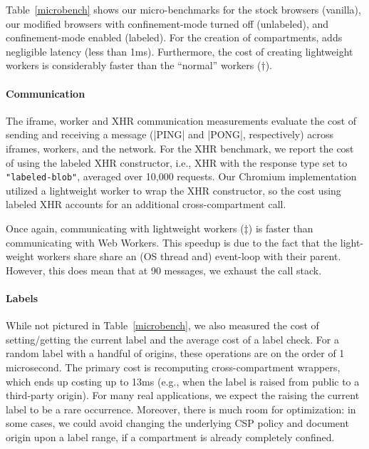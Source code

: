 Table~\ref{microbench} shows our micro-benchmarks for the stock
browsers (vanilla), our modified browsers with confinement-mode turned
off (unlabeled), and confinement-mode enabled (labeled).
%
For the creation of compartments, \sys{} adds negligible latency (less
than 1ms).
%
Furthermore, the cost of creating lightweight workers is considerably
faster than the ``normal'' workers ($\dagger$).

\paragraph{Communication} The iframe, worker and XHR communication measurements evaluate the
cost of sending and receiving a message (\js|PING| and \js|PONG|,
respectively) across iframes, workers, and the network.
%
For the XHR benchmark, we report the cost of using the labeled XHR
constructor, i.e., XHR with the response type set to
\verb|"labeled-blob"|, averaged over 10,000 requests.
%
Our Chromium implementation utilized a lightweight worker to wrap the XHR
constructor, so the cost using labeled XHR accounts for an additional
cross-compartment call.

Once again, communicating with lightweight workers ($\ddagger$)
is
faster than communicating with Web Workers.
%
This speedup is due to the fact that the light-weight workers share
share an (OS thread and) event-loop with their parent.
%
However, this does mean that at 90 messages, we exhaust the call
stack.


\paragraph{Labels} While not pictured in Table~\ref{microbench},
we also measured the cost of setting/getting the current label and the
average cost of a label check.
%
For a random label with a handful of origins, these operations are on
the order of 1 microsecond.
%
The primary cost is recomputing
cross-compartment wrappers, which ends up costing up to 13ms (e.g., when
the label is raised from public to a third-party origin).
%
For many real applications, we expect the raising the current label
to be a rare occurrence.
%
Moreover, there is much room for optimization: in some cases,
we could avoid changing the underlying CSP policy and document
origin upon a label range, if a compartment is already completely confined.
 
